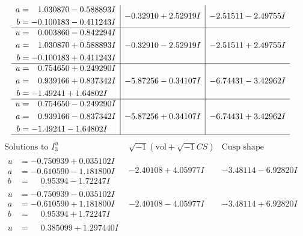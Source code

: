 \documentclass[1p]{elsarticle_modified}
\theoremstyle{definition}
\newcommand{\I}{\sqrt{-1}}
\begin{document}
$$\begin{array}{c|c|c}
\begin{aligned}
a &= \phantom{-}1.030870 - 0.588893 I \\
b &= -0.100183 - 0.411243 I\end{aligned}
 & -0.32910 + 2.52919 I & -2.51511 - 2.49755 I \\ \hline\begin{aligned}
u &= \phantom{-}0.003860 - 0.842294 I \\
a &= \phantom{-}1.030870 + 0.588893 I \\
b &= -0.100183 + 0.411243 I\end{aligned}
 & -0.32910 - 2.52919 I & -2.51511 + 2.49755 I \\ \hline\begin{aligned}
u &= \phantom{-}0.754650 + 0.249290 I \\
a &= \phantom{-}0.939166 + 0.837342 I \\
b &= -1.49241 + 1.64802 I\end{aligned}
 & -5.87256 - 0.34107 I & -6.74431 - 3.42962 I \\ \hline\begin{aligned}
u &= \phantom{-}0.754650 - 0.249290 I \\
a &= \phantom{-}0.939166 - 0.837342 I \\
b &= -1.49241 - 1.64802 I\end{aligned}
 & -5.87256 + 0.34107 I & -6.74431 + 3.42962 I\\
 \hline 
 \end{array}$$\newpage$$\begin{array}{c|c|c}  
\text{Solutions to }I^u_{3}& \I (\text{vol} + \sqrt{-1}CS) & \text{Cusp shape}\\
 \hline 
\begin{aligned}
u &= -0.750939 + 0.035102 I \\
a &= -0.610590 - 1.181800 I \\
b &= \phantom{-}0.95394 - 1.72247 I\end{aligned}
 & -2.40108 + 4.05977 I & -3.48114 - 6.92820 I \\ \hline\begin{aligned}
u &= -0.750939 - 0.035102 I \\
a &= -0.610590 + 1.181800 I \\
b &= \phantom{-}0.95394 + 1.72247 I\end{aligned}
 & -2.40108 - 4.05977 I & -3.48114 + 6.92820 I \\ \hline\begin{aligned}
u &= \phantom{-}0.385099 + 1.297440 I \\

\end{aligned}
\end{array}$$
\end{document}

